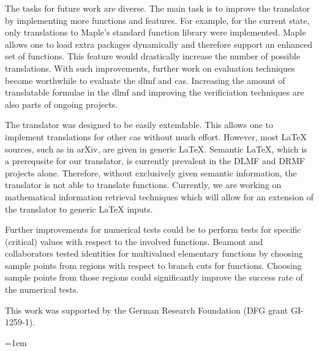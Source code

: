 \documentclass[a4paper,11pt]{article}
\newcommand{\Maple}{Maple}
\theoremstyle{defTheoStyle}
\theoremstyle{defExampStyle}
\begin{document}
	The tasks for future work are diverse. The main task is to improve the translator by implementing more functions and features. For example, for the current state, only translations to \Maple's standard function library were implemented. \Maple{} allows one to load extra packages dynamically and therefore support an enhanced set of functions. This feature would drastically increase the number of possible translations. With such improvements, further work on evaluation techniques become worthwhile to evaluate the \gls*{dlmf} and \gls*{cas}.
	Increasing the amount of translatable formulae in the \gls*{dlmf} and improving the verificiation 
	techniques are also parts of ongoing projects. 
	
	The translator was designed to be easily extendable. This allows one to implement translations for other \gls*{cas} without much effort.
	However, most \LaTeX{} sources, such as in arXiv, are given in generic \LaTeX{}. Semantic \LaTeX{}, which is a prerequsite for our translator, is currently prevalent in the DLMF and DRMF projects alone. Therefore, without exclusively given semantic information, the translator is not able to translate functions. Currently, we are working on mathematical information retrieval techniques which will allow for an extension of the translator to generic \LaTeX{} inputs.
	
	Further improvements for numerical tests could be to perform tests for specific (critical) values \parencite{DBLP:journals/aaecc/BeaumontBDP07} with respect to the involved functions. Beamont and collaborators tested identities for multivalued elementary functions by choosing sample points from regions with respect to branch cuts for functions. Choosing sample points from those regions could significantly improve the success rate of the numerical tests.
	
	 This work was supported by the German Research Foundation (DFG grant GI-1259-1).
	
	\emergencystretch=1em
	\printbibliography%
	
\end{document}
